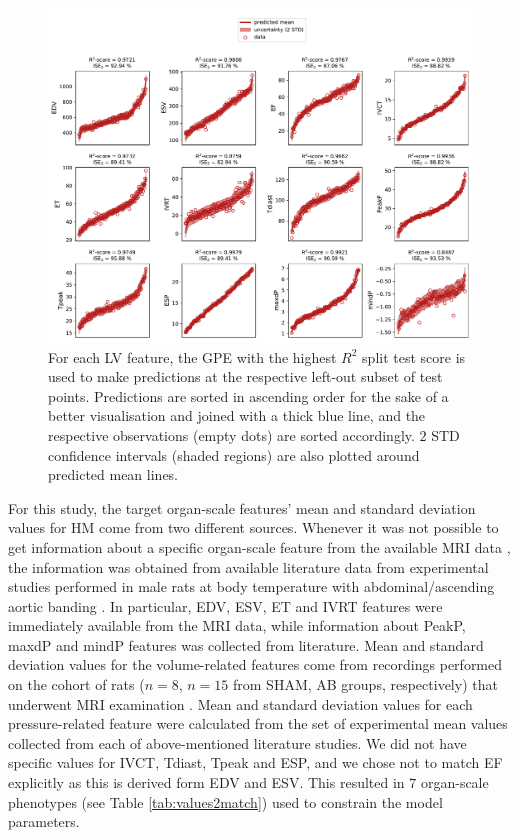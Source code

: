 \begin{figure}[!ht]
    \myfloatalign
    \includegraphics[width=\textwidth]{figures/chapter04/bgpes_vs_bsplit_ab.pdf}
    \caption{For each LV feature, the GPE with the highest $R^2$ split test score is used to make predictions at the respective left-out subset of test points. Predictions are sorted in ascending order for the sake of a better visualisation and joined with a thick blue line, and the respective observations (empty dots) are sorted accordingly. $2$ STD confidence intervals (shaded regions) are also plotted around predicted mean lines.}
    \label{fig:fig:gpesexampleinferencesham}
\end{figure}

\vspace{0.2cm}
For this study, the target organ-scale features' mean and standard deviation values for HM come from two different sources. Whenever it was not possible to get information about a specific organ-scale feature from the available MRI data \cite{Roe:2017}, the information was obtained from available literature data from experimental studies performed in male rats at body temperature with abdominal/ascending aortic banding \cite{Nemeth:2016, Sato:1990, Schunkert:1995, Loot:2005, Liu:2014, Ku:2014, Ruppert:2018, Schunkert:1990, Ruppert:2016}. In particular, EDV, ESV, ET and IVRT features were immediately available from the MRI data, while information about PeakP, maxdP and mindP features was collected from literature. Mean and standard deviation values for the volume-related features come from recordings performed on the cohort of rats ($n=8$, $n=15$ from SHAM, AB groups, respectively) that underwent MRI examination \cite{Roe:2017}. Mean and standard deviation values for each pressure-related feature were calculated from the set of experimental mean values collected from each of above-mentioned literature studies. We did not have specific values for IVCT, Tdiast, Tpeak and ESP, and we chose not to match EF explicitly as this is derived form EDV and ESV. This resulted in $7$ organ-scale phenotypes (see Table \ref{tab:values2match}) used to constrain the model parameters.

